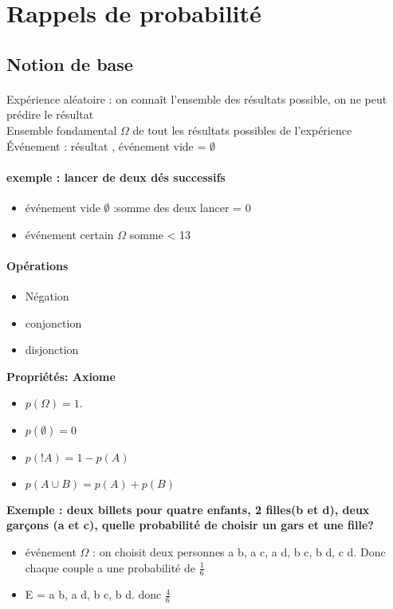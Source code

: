 \documentclass{article}
\begin{document}
\section{Rappels de probabilité}
\subsection{Notion de base}
\paragraph{} 
Expérience aléatoire : on connaît l'ensemble des résultats possible, on ne peut prédire le résultat\\ Ensemble fondamental $\Omega$ de tout les résultats possibles de l'expérience\\Événement : résultat , événement vide = $\emptyset$
\paragraph{exemple : lancer de deux dés successifs} 
\begin{itemize}
\item événement vide $\emptyset$  :somme des deux lancer =  0
\item événement certain $\Omega$ somme < 13
\end{itemize}
\paragraph{Opérations} 
\begin{itemize}
\item Négation
\item conjonction
\item disjonction 
\end{itemize}

\textbf{Propriétés: Axiome}
\begin{itemize}
\item  $p(\Omega) = 1$.
\item $p(\emptyset)=0$
\item $p(!A)=1-p(A)$
\item $p(A \cup B) = p(A)+p(B)$
\end{itemize}

\textbf{Exemple : deux billets pour quatre enfants, 2 filles(b et d), deux garçons (a et c),  quelle probabilité de choisir un gars et une fille?}
\begin{itemize}
\item événement $\Omega$ : on choisit deux personnes {a b, a c, a d, b c, b d, c d}. Donc chaque couple a une probabilité de $\frac{1}{6}$
\item E = {a b, a d, b c, b d}. donc $\frac{4}{6}$
\end{itemize}
\end{document}
